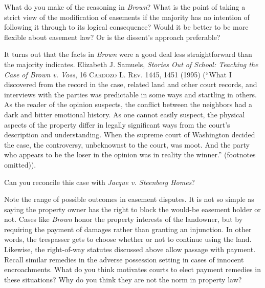 
\item What do you make of the reasoning in \textit{Brown}? What is the point of
taking a strict view of the modification of easements if the majority has no
intention of following it through to its logical consequence? Would it be better
to be more flexible about easement law? Or is the dissent's approach preferable?


\item It turns out that the facts in \textit{Brown} were a good deal less
straightforward than the majority indicates. Elizabeth J.
Samuels, \textit{Stories Out of School: Teaching the Case of Brown v. Voss},  16
\textsc{Cardozo L. Rev}. 1445, 1451 (1995) (``What I discovered from the record
in the case, related land and other court records, and interviews with the
parties was predictable in some ways and startling in others. As the reader of
the opinion suspects, the conflict between the neighbors had a dark and bitter
emotional history. As one cannot easily suspect, the physical aspects of the
property differ in legally significant ways from the court's description and
understanding. When the supreme court of Washington decided the case, the
controversy, unbeknownst to the court, was moot. And the party who appears to be
the loser in the opinion was in reality the winner.'' (footnotes omitted)). 


\item Can you reconcile this case with \textit{Jacque v. Steenberg Homes}?


\item Note the range of possible outcomes in easement disputes. It is not so
simple as saying the property owner has the right to block the would-be easement
holder or not. Cases like \textit{Brown} honor the property interests of the
landowner, but by requiring the payment of damages rather than granting an
injunction. In other words, the trespasser gets to choose whether or not to
continue using the land. Likewise, the right-of-way statutes discussed above
allow passage with payment. Recall similar remedies in the adverse possession
setting in cases of innocent encroachments. What do you think motivates courts
to elect payment remedies in these situations? Why do you think they are not the
norm in property law? 

